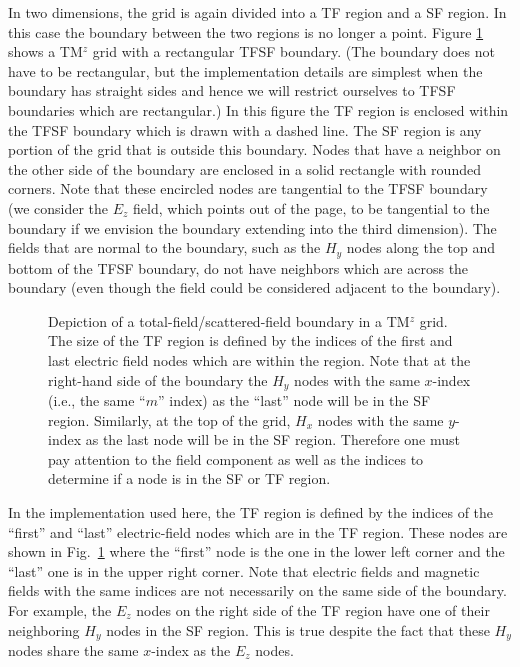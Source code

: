 In two dimensions, the grid is again divided into a TF region and a SF
region.  In this case the boundary between the two regions is no
longer a point.  Figure \ref{fig:tmzTfsf} shows a TM$^z$ grid with a
rectangular TFSF boundary.  (The boundary does not have to be
rectangular, but the implementation details are simplest when the
boundary has straight sides and hence we will restrict ourselves to
TFSF boundaries which are rectangular.)  In this figure the TF region
is enclosed within the TFSF boundary which is drawn with a dashed
line.  The SF region is any portion of the grid that is outside this
boundary.  Nodes that have a neighbor on the other side of the
boundary are enclosed in a solid rectangle with rounded corners.  Note
that these encircled nodes are tangential to the TFSF boundary (we
consider the $E_z$ field, which points out of the page, to be
tangential to the boundary if we envision the boundary extending into
the third dimension).  The fields that are normal to the boundary,
such as the $H_y$ nodes along the top and bottom of the TFSF boundary,
do not have neighbors which are across the boundary (even though the
field could be considered adjacent to the boundary).  
\begin{figure}
  \begin{center}
  \end{center} \caption{Depiction of a total-field/scattered-field
  boundary in a TM$^z$ grid.  The size of the TF region is defined by
  the indices of the first and last electric field nodes which are
  within the region.  Note that at the right-hand side of the boundary
  the $H_y$ nodes with the same $x$-index (i.e., the same ``$m$''
  index) as the ``last'' node will be in the SF region.  Similarly, at
  the top of the grid, $H_x$ nodes with the same $y$-index as the last
  node will be in the SF region.  Therefore one must pay attention to
  the field component as well as the indices to determine if a node is
  in the SF or TF region.} \label{fig:tmzTfsf}
\end{figure}

In the implementation used here, the TF region is defined by the
indices of the ``first'' and ``last'' electric-field nodes which are
in the TF region.  These nodes are shown in Fig.\ \ref{fig:tmzTfsf}
where the ``first'' node is the one in the lower left corner and the
``last'' one is in the upper right corner.  Note that electric fields
and magnetic fields with the same indices are not necessarily on the
same side of the boundary.  For example, the $E_z$ nodes on the right
side of the TF region have one of their neighboring $H_y$ nodes in the
SF region.  This is true despite the fact that these $H_y$ nodes share
the same $x$-index as the $E_z$ nodes.

